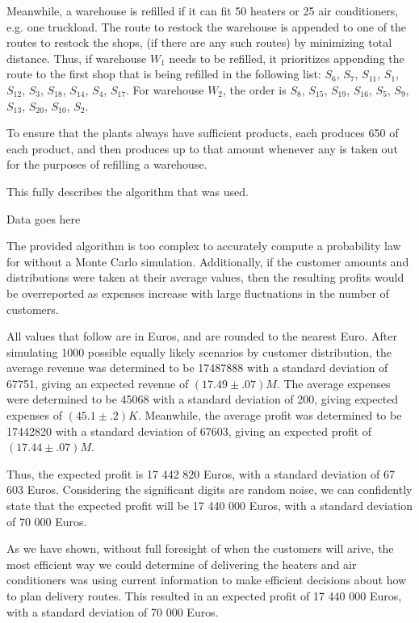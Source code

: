 \begin{paper}
Meanwhile, a warehouse is refilled if it can fit 50 heaters or 25 air conditioners, e.g. one truckload.
The route to restock the warehouse is appended to one of the routes to restock the shops, (if there are any such routes) by minimizing total distance.
Thus, if warehouse $W_1$ needs to be refilled, it prioritizes appending the route to the first shop that is being refilled in the following list: $S_6$, $S_7$, $S_{11}$, $S_1$, $S_{12}$, $S_3$, $S_{18}$, $S_{14}$, $S_4$, $S_{17}$.
For warehouse $W_2$, the order is $S_8$, $S_{15}$, $S_{19}$, $S_{16}$, $S_5$, $S_9$, $S_{13}$, $S_{20}$, $S_{10}$, $S_2$.

To ensure that the plants always have sufficient products, each produces 650 of each product, and then produces up to that amount whenever any is taken out for the purposes of refilling a warehouse.

This fully describes the algorithm that was used.


Data goes here


The provided algorithm is too complex to accurately compute a probability law for without a Monte Carlo simulation.
Additionally, if the customer amounts and distributions were taken at their average values, then the resulting profits would be overreported as expenses increase with large fluctuations in the number of customers.

All values that follow are in Euros, and are rounded to the nearest Euro.
After simulating 1000 possible equally likely scenarios by customer distribution, the average revenue was determined to be \SI{17487888}{} with a standard deviation of \SI{67751}{}, giving an expected revenue of $(17.49\pm.07)M$.
The average expenses were determined to be \SI{45068}{} with a standard deviation of \SI{200}{}, giving expected expenses of $(45.1\pm.2)K$.
Meanwhile, the average profit was determined to be \SI{17442820}{} with a standard deviation of \SI{67603}{}, giving an expected profit of $(17.44\pm.07)M$.

Thus, the expected profit is 17 442 820 Euros, with a standard deviation of 67 603 Euros.
Considering the significant digits are random noise, we can confidently state that the expected profit will be 17 440 000 Euros, with a standard deviation of 70 000 Euros.


As we have shown, without full foresight of when the customers will arive, the most efficient way we could determine of delivering the heaters and air conditioners was using current information to make efficient decisions about how to plan delivery routes.
This resulted in an expected profit of 17 440 000 Euros, with a standard deviation of 70 000 Euros.


\end{paper}
